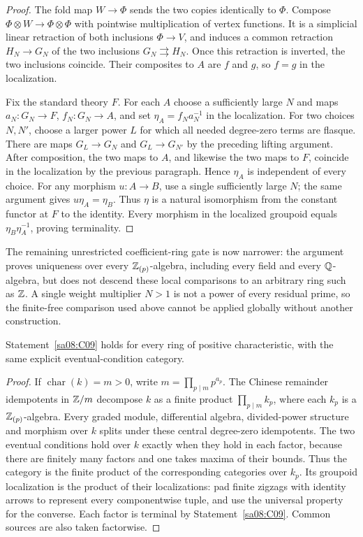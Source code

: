 \begin{proof}
The fold map $W\to\Phi$ sends the two copies identically to
$\Phi$. Compose $\Phi\otimes W\to\Phi\otimes\Phi$ with
pointwise multiplication of vertex functions. It is a simplicial
linear retraction of both inclusions $\Phi\to V$, and induces a
common retraction $H_N\to G_N$ of the two inclusions
$G_N\rightrightarrows H_N$. Once this retraction is inverted, the
two inclusions coincide. Their composites to $A$ are $f$ and $g$,
so $f=g$ in the localization.

Fix the standard theory $F$. For each $A$ choose a sufficiently
large $N$ and maps $a_N:G_N\to F$, $f_N:G_N\to A$, and set
$\eta_A=f_Na_N^{-1}$ in the localization. For two choices $N,N'$,
choose a larger power $L$ for which all needed degree-zero terms
are flasque. There are maps $G_L\to G_N$ and $G_L\to G_{N'}$ by
the preceding lifting argument. After composition, the two maps
to $A$, and likewise the two maps to $F$, coincide in the
localization by the previous paragraph. Hence $\eta_A$ is
independent of every choice. For any morphism $u:A\to B$, use a
single sufficiently large $N$; the same argument gives
$u\eta_A=\eta_B$. Thus $\eta$ is a natural isomorphism from the
constant functor at $F$ to the identity. Every morphism in the
localized groupoid equals $\eta_B\eta_A^{-1}$, proving terminality.
\end{proof}

The remaining unrestricted coefficient-ring gate is now narrower:
the argument proves uniqueness over every $\mathbb Z_{(p)}$-algebra,
including every field and every $\mathbb Q$-algebra, but does not descend
these local comparisons to an arbitrary ring such as $\mathbb Z$. A
single weight multiplier $N>1$ is not a power of every residual
prime, so the finite-free comparison used above cannot be applied
globally without another construction.

\begin{corollary}\label{sa08:C10}
Statement~\ref{sa08:C09} holds for every ring of positive
characteristic, with the same explicit eventual-condition category.
\end{corollary}
\begin{proof}
If $\operatorname{char}(k)=m>0$, write
$m=\prod_{p\mid m}p^{a_p}$. The Chinese remainder idempotents in
$\mathbb Z/m$ decompose $k$ as a finite product $\prod_{p\mid m}k_p$,
where each $k_p$ is a $\mathbb Z_{(p)}$-algebra. Every graded module,
differential algebra, divided-power structure and morphism over $k$
splits under these central degree-zero idempotents. The two eventual
conditions hold over $k$ exactly when they hold in each factor,
because there are finitely many factors and one takes maxima of
their bounds. Thus the category is the finite product of the
corresponding categories over $k_p$. Its groupoid localization is
the product of their localizations: pad finite zigzags with identity
arrows to represent every componentwise tuple, and use the universal
property for the converse. Each factor is terminal by
Statement~\ref{sa08:C09}. Common sources are also taken factorwise.
\end{proof}

